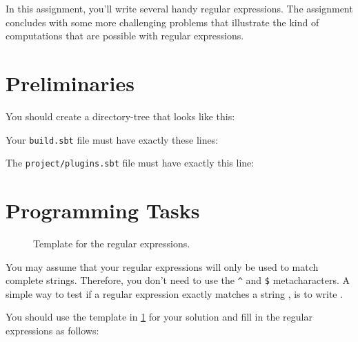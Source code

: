 
In this assignment, you'll write several handy regular expressions. The assignment concludes with some more challenging problems that illustrate the kind of computations that are possible with regular expressions.

\section{Preliminaries}

You should create a directory-tree that looks like this:


Your \texttt{build.sbt} file must have exactly these lines:


The \texttt{project/plugins.sbt} file must have exactly this line:


\section{Programming Tasks}

\begin{figure}
\caption{Template for the regular expressions.}
\label{regex_template}
\end{figure}

You may assume that your regular expressions will only be used to match complete strings. Therefore, you don't need to use the \texttt{\^} and \texttt{\$} metacharacters. A simple way to test if a regular expression  exactly matches a string , is to write .

You should use the template in \cref{regex_template} for your solution and fill in the regular expressions as follows:

